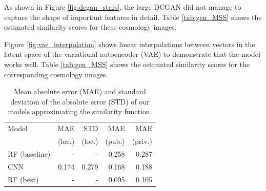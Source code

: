 \documentclass[10pt,conference,compsocconf]{IEEEtran}
\begin{document}
As shown in Figure \ref{fig:dcgan_stars}, the large DCGAN did not manage to capture the shape of important features in detail. Table \ref{tab:gen_MSS} shows the estimated similarity scores for these cosmology images.

Figure \ref{fig:vae_interpolation} shows linear interpolations between vectors in the latent space of the variational autoencoder (VAE) to demonstrate that the model works well. Table \ref{tab:gen_MSS} shows the estimated similarity scores for the corresponding cosmology images.


\begin{table}\centering
    \begin{tabular}{lrr|rr}
    \toprule
        Model           & MAE           & STD           &  MAE          &  MAE \\
                        & (loc.)        & (loc.)        & (pub.)        & (priv.) \\
    \midrule
        RF (baseline)   & -             & -             & \SI{0.258}{}  & \SI{0.287}{} \\
        CNN             & \SI{0.174}{}  & \SI{0.279}{}  & \SI{0.168}{}  & \SI{0.188}{} \\
        RF (best)       & -             & -             & \SI{0.095}{}  & \SI{0.105}{} \\
    \bottomrule
    \end{tabular}
\caption{Mean absolute error (MAE) and standard deviation of the absolute error (STD) of our models approximating the similarity function.}
\label{tab:SFA_MSS}
\end{table}
\end{document}
